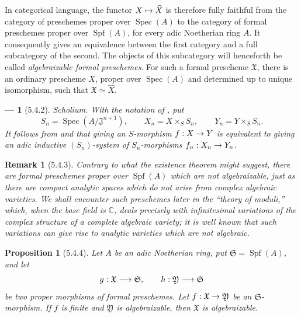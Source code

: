 \documentclass[oneside]{amsart}
\theoremstyle{ega-env-style}
\newtheorem*{env}{---}
\theoremstyle{ega-thm-env-style}
\newtheorem*{proposition}{Proposition}
\theoremstyle{ega-defn-env-style}
\newtheorem*{remark}{Remark}
\def\Spec{\operatorname{Spec}}
\def\Spf{\operatorname{Spf}}
\renewcommand{\to}{\mathchoice{\longrightarrow}{\rightarrow}{\rightarrow}{\rightarrow}}
\let\mapstoo\mapsto
\renewcommand{\mapsto}{\mathchoice{\longmapsto}{\mapstoo}{\mapstoo}{\mapstoo}}
\let\EGAOriginalLabel\label
\renewcommand{\label}[1]{\phantomsection\EGAOriginalLabel{#1}}
\begin{document}
In categorical language, the functor
$X\mapsto\widehat{X}$ is therefore fully faithful
 from the category of preschemes proper over
$\Spec(A)$ to the category of formal preschemes proper over
$\Spf(A)$, for every adic Noetherian ring $A$.  It consequently
gives an equivalence between the first category and a full
subcategory of the second.  The objects of this subcategory will
henceforth be called \emph{algebraizable formal preschemes}.  For
such a formal prescheme $\mathfrak{X}$, there is an ordinary
prescheme $X$, proper over $\Spec(A)$ and determined up to unique
isomorphism, such that $\mathfrak{X}\simeq\widehat{X}$.

\begin{env}[5.4.2]
\label{III.5.4.2}
\emph{Scholium.}
With the notation of , put
\[
  S_n=\Spec(A/\mathfrak{J}^{n+1}),\qquad
  X_n=X\times_S S_n,\qquad
  Y_n=Y\times_S S_n.
\]
It follows from  and  that
giving an $S$-morphism $f:X\to Y$ is equivalent to giving an adic
inductive $(S_n)$-system  of
$S_n$-morphisms $f_n:X_n\to Y_n$.
\end{env}

\begin{remark}[5.4.3]
\label{III.5.4.3}
Contrary to what the existence theorem  might
suggest, there are formal preschemes proper over $\Spf(A)$ which
are \emph{not algebraizable}, just as there are compact analytic
spaces which do not arise from complex algebraic varieties.  We
shall encounter such preschemes later in the ``theory of moduli,''
which, when the base field is $\mathbb{C}$, deals precisely with
infinitesimal variations of the complex structure of a complete
algebraic variety; it is well known that such variations can give
rise to analytic varieties which are not algebraic.
\end{remark}

\begin{proposition}[5.4.4]
\label{III.5.4.4}
Let $A$ be an adic Noetherian ring, put
$\mathfrak{S}=\Spf(A)$, and let
\[
  g:\mathfrak{X}\to\mathfrak{S},
  \qquad
  h:\mathfrak{Y}\to\mathfrak{S}
\]
be two proper morphisms of formal preschemes.  Let
$f:\mathfrak{X}\to\mathfrak{Y}$ be an
$\mathfrak{S}$-morphism.  If $f$ is finite and
$\mathfrak{Y}$ is algebraizable, then $\mathfrak{X}$ is
algebraizable.
\end{proposition}
\end{document}

